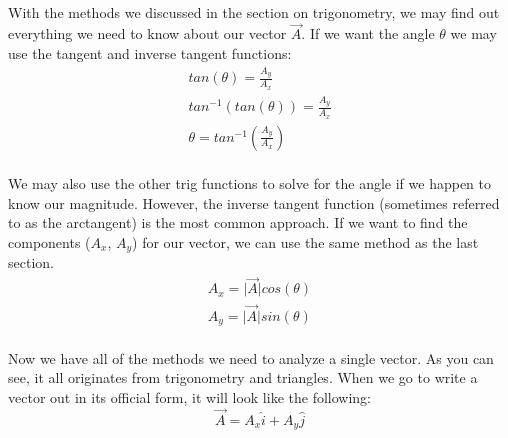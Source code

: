 \documentclass[12pt, letterpaper]{report}
\begin{document}
	\paragraph{} With the methods we discussed in the section on trigonometry, we may find out everything we need to know about our vector $\vec{A}$. If we want the angle $\theta$ we may use the tangent and inverse tangent functions:
	\begin{align*}
	tan\left(\theta\right) = \frac{A_y}{A_x}\\
	tan^{-1}\left(tan\left(\theta\right)\right) = \frac{A_y}{A_x}\\
	\theta = tan^{-1}\left(\frac{A_y}{A_x}\right)
	\end{align*}
	\paragraph{} We may also use the other trig functions to solve for the angle if we happen to know our magnitude. However, the inverse tangent function (sometimes referred to as the arctangent) is the most common approach. If we want to find the components ($A_x$, $A_y$) for our vector, we can use the same method as the last section.
	\begin{align*}
	A_x = \lvert\vec{A}\rvert cos\left(\theta\right)\\
	A_y = \lvert\vec{A}\rvert sin\left(\theta\right)
	\end{align*}
	\paragraph{} Now we have all of the methods we need to analyze a single vector. As you can see, it all originates from trigonometry and triangles. When we go to write a vector out in its official form, it will look like the following:
	\begin{equation*}
	\vec{A} = A_x\hat{i} + A_y\hat{j}
	\end{equation*}
\end{document}
